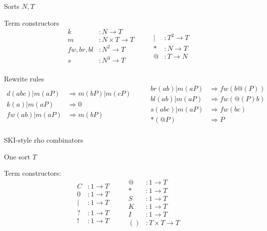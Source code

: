 \documentclass{llncs}
\begin{document}
Sorts $N, T$

Term constructors
\[\begin{array}{rl}
  k &: N \to T \\
  m &: N \times T \to T \\
  fw,br,bl &: N^2 \to T \\
  s &: N^3 \to T \\
\end{array} \quad \quad
\begin{array}{rl}
  | &: T^2 \to T \\
  * &: N \to T \\
  @ &: T \to N \\
\end{array}\]

Rewrite rules
\[\begin{array}{rl}
  d(abc) | m(aP) & \Rightarrow m(bP) | m(cP) \\
  k(a) | m(aP) & \Rightarrow 0 \\
  fw(ab) | m(aP) & \Rightarrow m(bP) \\
\end{array} \quad \quad
\begin{array}{rl}
  br(ab) | m(aP) & \Rightarrow fw(b@(P)) \\
  bl(ab) | m(aP) & \Rightarrow fw(@(P)b) \\
  s(abc) | m(aP) & \Rightarrow fw(bc) \\
  *(@P) & \Rightarrow P \\
\end{array}\]



SKI-style rho combinators

One sort $T$

Term constructors:
\[\begin{array}{rl}
  C &: 1 \to T \\
  0 &: 1 \to T \\
  | &: 1 \to T \\
  ? &: 1 \to T \\
  ! &: 1 \to T \\
\end{array} \quad \quad
\begin{array}{rl}
  @ &: 1 \to T \\
  * &: 1 \to T \\
  S &: 1 \to T \\
  K &: 1 \to T \\
  I &: 1 \to T \\
  () &: T \times T \to T \\
\end{array}\]
\end{document}
